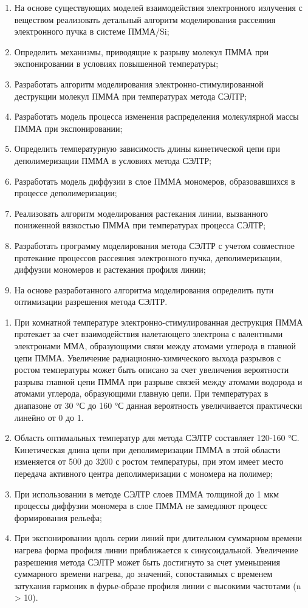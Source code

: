 \begin{enumerate}
  \item На основе существующих моделей взаимодействия электронного излучения с веществом реализовать детальный алгоритм моделирования рассеяния электронного пучка в системе ПММА/Si;
  \item Определить механизмы, приводящие к разрыву молекул ПММА при экспонировании в условиях повышенной температуры;
  \item Разработать алгоритм моделирования электронно-стимулированной деструкции молекул ПММА при температурах метода СЭЛТР;
  \item Разработать модель процесса изменения распределения молекулярной массы ПММА при экспонировании;
  \item Определить температурную зависимость длины кинетической цепи при деполимеризации ПММА в условиях метода СЭЛТР;
  \item Разработать модель диффузии в слое ПММА мономеров, образовавшихся в процессе деполимеризации;
  \item Реализовать алгоритм моделирования растекания линии, вызванного пониженной вязкостью ПММА при температурах процесса СЭЛТР;
  \item Разработать программу моделирования метода СЭЛТР с учетом совместное протекание процессов рассеяния электронного пучка, деполимеризации, диффузии мономеров и растекания профиля линии;
  \item На основе разработанного алгоритма моделирования определить пути оптимизации разрешения метода СЭЛТР.
\end{enumerate}

\begin{enumerate}
	\item При комнатной температуре электронно-стимулированная деструкция ПММА протекает за счет взаимодействия налетающего электрона с валентными электронами ММА, образующими связи между атомами углерода в главной цепи ПММА. Увеличение радиационно-химического выхода разрывов с ростом температуры может быть описано за счет увеличения вероятности разрыва главной цепи ПММА при разрыве связей между атомами водорода и атомами углерода, образующими главную цепи. При температурах в диапазоне от 30 °С до 160 °С данная вероятность увеличивается практически линейно от 0 до 1.
	\item Область оптимальных температур для метода СЭЛТР составляет 120-160 °С. Кинетическая длина цепи при деполимеризации ПММА в этой области изменяется от 500 до 3200 с ростом температуры, при этом имеет место передача активного центра деполимеризации с мономера на полимер;
	\item При использовании в методе СЭЛТР слоев ПММА толщиной до 1 мкм процессы диффузии мономера в слое ПММА не замедляют процесс формирования рельефа;
	\item При экспонировании вдоль серии линий при длительном суммарном времени нагрева форма профиля линии приближается к синусоидальной. Увеличение разрешения метода СЭЛТР может быть достигнуто за счет уменьшения суммарного времени нагрева, до значений, сопоставимых с временем затухания гармоник в фурье-образе профиля линии с высокими частотами (n > 10).
\end{enumerate}

